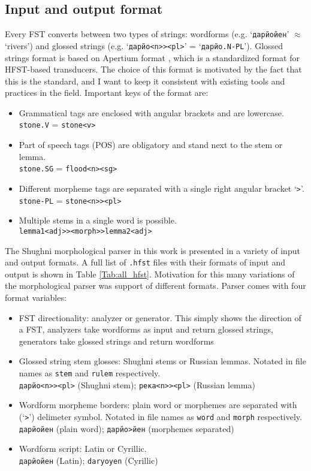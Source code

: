 \subsection{Input and output format}
Every FST converts between two types of strings: wordforms (e.g. `\texttt{дарйойен}' $\approx$ `rivers') and glossed strings (e.g. `\texttt{дарйо<n>><pl>}' = `\texttt{дарйо.N-PL}'). Glossed strings format is based on Apertium format , which is a standardized format for HFST-based transducers. The choice of this format is motivated by the fact that this is the standard, and I want to keep it consistent with existing tools and practices in the field. Important keys of the format are:
\begin{itemize}
    \item Grammatical tags are enclosed with angular brackets and are lowercase.\\
    \texttt{stone.V} = \texttt{stone<v>}
    \item Part of speech tags (POS) are obligatory and stand next to the stem or lemma.\\
    \texttt{stone.SG} = \texttt{flood<n><sg>}
    \item Different morpheme tags are separated with a single right angular bracket `\texttt{>}'.\\
    \texttt{stone-PL} = \texttt{stone<n>><pl>}
    \item Multiple stems in a single word is possible.\\
    \texttt{lemma1<adj>><morph>>lemma2<adj>}
\end{itemize}

The Shughni morphological parser in this work is presented in a variety of input and output formats. A full list of \texttt{.hfst} files with their formats of input and output is shown in Table \ref{Tab:all_hfst}. Motivation for this many variations of the morphological parser was support of different formats. Parser comes with four format variables:
\begin{itemize}
    \item FST directionality: analyzer or generator. This simply shows the direction of a FST, analyzers take wordforms as input and return glossed strings, generators take glossed strings and return wordforms
    \item Glossed string stem glosses: Shughni stems or Russian lemmas. Notated in file names as \texttt{stem} and \texttt{rulem} respectively.\\
    \texttt{дарйо<n>><pl>} (Shughni stem); \texttt{река<n>><pl>} (Russian lemma)
    \item Wordform morpheme borders: plain word or morphemes are separated with (`\texttt{>}') delimeter symbol. Notated in file names as \texttt{word} and \texttt{morph} respectively.\\
    \texttt{дарйойен} (plain word); \texttt{дарйо>йен} (morphemes separated)
    \item Wordform script: Latin or Cyrillic.\\
    \texttt{дарйойен} (Latin); \texttt{daryoyen} (Cyrillic)
\end{itemize}

